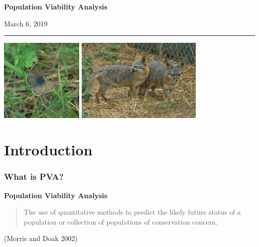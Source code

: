 \documentclass[color=usenames,dvipsnames]{beamer}\usepackage[]{graphicx}\usepackage[]{color}
\begin{document}

\begin{frame}[plain]
  \begin{center}
    {\huge \bf Population Viability Analysis \par}
    \vspace{0.5cm}
    { \Large March 6, 2019} \\
    {\color{blue} \rule{\textwidth}{1pt}}
    \vfill
    \includegraphics[height=4cm,keepaspectratio]{figs/Fenders_blue} %
    \hspace{0.5cm}
    \includegraphics[height=4cm,keepaspectratio]{figs/Urocyon_littoralis}
  \end{center}
\end{frame}




\section{Introduction}





\begin{frame}
  \frametitle{What is PVA?}
  \Large
  {\bf Population Viability Analysis \\}
  \begin{quote}
    The use of quantitative methods to predict the likely future
    status of a population or collection of populations of
    conservation concern.
  \end{quote}
  \small
  \flushright (Morris and Doak 2002) \par
\end{frame}
\end{document}
